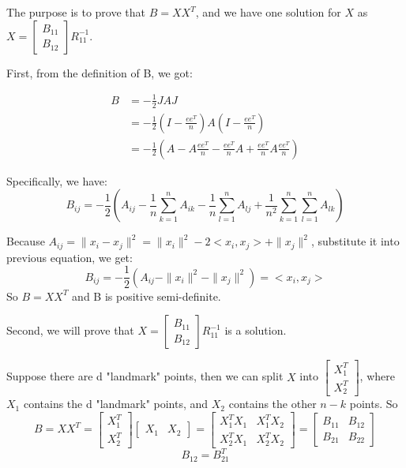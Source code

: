 \documentclass[a4paper, 11pt]{article}
\begin{document}
The purpose is to prove that $B = XX^T$, and we have one solution for $X$ as 
$X = \begin{bmatrix}
B_{11} \\
B_{12} 
\end{bmatrix} R_{11}^{-1}$.

First, from the definition of B, we got:

\begin{align*}
B & = -\frac{1}{2}JAJ \\
  & = -\frac{1}{2}(I-\frac{ee^T}{n})A(I-\frac{ee^T}{n}) \\
  & = -\frac{1}{2}(A-A\frac{ee^T}{n} - \frac{ee^T}{n}A + \frac{ee^T}{n}A\frac{ee^T}{n})
\end{align*}

Specifically, we have:
$$
B_{ij} = -\frac{1}{2}(A_{ij} - \frac{1}{n}\sum_{k=1}^n A_{ik}-\frac{1}{n}\sum_{l=1}^n A_{lj}+\frac{1}{n^2} \sum_{k=1}^n \sum_{l=1}^n A_{lk})
$$

Because $A_{ij} = \| x_i - x_j \| ^2 = \| x_i \|^2-2<x_i,x_j>+\|x_j\|^2$, substitute it into previous equation, we get:
$$
B_{ij}=-\frac{1}{2}(A_{ij}-\|x_i\|^2-\|x_j\|^2)=<x_i,x_j>
$$
So $B=XX^T$ and B is positive semi-definite.

Second, we will prove that $X = \begin{bmatrix}
B_{11} \\
B_{12} 
\end{bmatrix} R_{11}^{-1}$ is a solution.

Suppose there are d "landmark" points, then we can split $X$ into $\begin{bmatrix}
X_1^T \\ X_2^T
\end{bmatrix}$, where $X_1$ contains the d "landmark" points, and $X_2$ contains the other $n-k$ points. So $$ B = XX^T = \begin{bmatrix}
X_1^T \\ X_2^T
\end{bmatrix} \begin{bmatrix}
X_1 & X_2
\end{bmatrix}= \begin{bmatrix}
X_1^TX_1& X_1^TX_2 \\
X_2^TX_1& X_2^TX_2 
\end{bmatrix}= \begin{bmatrix}
B_{11} & B_{12} \\
B_{21} & B_{22} 
\end{bmatrix} $$
 $$B_{12} = B_{21}^T $$
\end{document}
